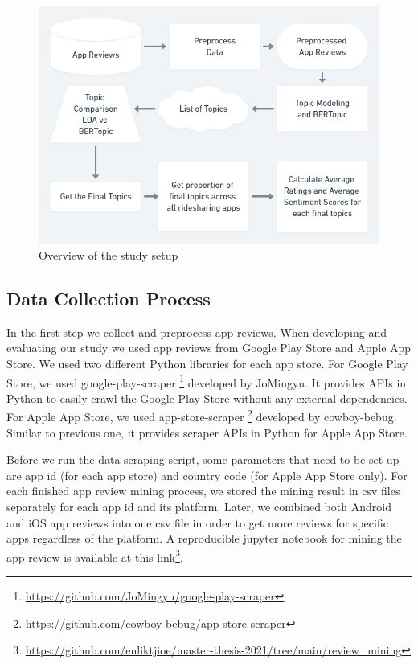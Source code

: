 \documentclass[12pt]{article}
\begin{document}
\begin{figure} [ht]
\begin{center}
\includegraphics[width=\textwidth]{figures/image2.png}
\caption{Overview of the study setup}
\label{fig:overview_of_study_setup}
\end{center}
\end{figure}


\subsection{Data Collection Process}
In the first step we collect and preprocess app reviews. When developing and evaluating our study we used app reviews from Google Play Store and Apple App Store. We used two different Python libraries for each app store. For Google Play Store, we used google-play-scraper \footnote{\url{https://github.com/JoMingyu/google-play-scraper}} developed by JoMingyu. It provides APIs in Python to easily crawl the Google Play Store without any external dependencies. For Apple App Store, we used app-store-scraper \footnote{\url{https://github.com/cowboy-bebug/app-store-scraper}} developed by cowboy-bebug. Similar to previous one, it provides scraper APIs in Python for Apple App Store. 

Before we run the data scraping script, some parameters that need to be set up are app id (for each app store) and country code (for Apple App Store only). For each finished app review mining process, we stored the mining result in csv files separately for each app id and its platform. Later, we combined both Android and iOS app reviews into one csv file in order to get more reviews for specific apps regardless of the platform. A reproducible jupyter notebook for mining the app review is available at this link\footnote{\url{https://github.com/enliktjioe/master-thesis-2021/tree/main/review_mining}}. 
\end{document}
